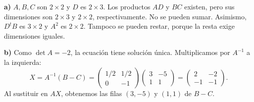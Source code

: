 \textbf{a)} $A,B,C$ son $2\times2$ y $D$ es $2\times3$.
Los productos $AD$ y $BC$ existen, pero sus dimensiones son
$2\times3$ y $2\times2$, respectivamente. No se pueden sumar.
Asimismo, $D^tB$ es $3\times2$ y $A^2$ es $2\times2$.
Tampoco se pueden restar, porque la resta exige dimensiones iguales.

\textbf{b)} Como $\det A=-2$, la ecuación tiene solución única.
Multiplicamos por $A^{-1}$ a la izquierda:
\[
X=A^{-1}(B-C)=
\begin{pmatrix}1/2&1/2\\0&-1\end{pmatrix}
\begin{pmatrix}3&-5\\1&1\end{pmatrix}
=\boxed{\begin{pmatrix}2&-2\\-1&-1\end{pmatrix}}.
\]
Al sustituir en $AX$, obtenemos las filas $(3,-5)$ y $(1,1)$ de $B-C$.
